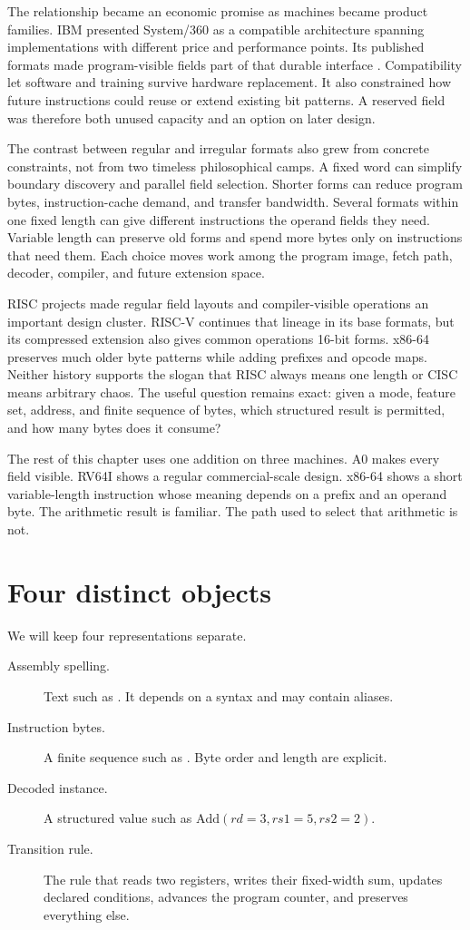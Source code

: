 The relationship became an economic promise as machines became product
families. IBM presented System/360 as a compatible architecture spanning
implementations with different price and performance points. Its published
formats made program-visible fields part of that durable interface
\autocite{amdahl1964system360,ibm1964system360principles}. Compatibility let
software and training survive hardware replacement. It also constrained how
future instructions could reuse or extend existing bit patterns. A reserved
field was therefore both unused capacity and an option on later design.

The contrast between regular and irregular formats also grew from concrete
constraints, not from two timeless philosophical camps. A fixed word can
simplify boundary discovery and parallel field selection. Shorter forms can
reduce program bytes, instruction-cache demand, and transfer bandwidth.
Several formats within one fixed length can give different instructions the
operand fields they need. Variable length can preserve old forms and spend
more bytes only on instructions that need them. Each choice moves work among
the program image, fetch path, decoder, compiler, and future extension space.

RISC projects made regular field layouts and compiler-visible operations an
important design cluster. RISC-V continues that lineage in its base formats,
but its compressed extension also gives common operations 16-bit forms.
x86-64 preserves much older byte patterns while adding prefixes and opcode
maps. Neither history supports the slogan that RISC always means one length
or CISC means arbitrary chaos. The useful question remains exact: given a
mode, feature set, address, and finite sequence of bytes, which structured
result is permitted, and how many bytes does it consume?

The rest of this chapter uses one addition on three machines. A0 makes every
field visible. RV64I shows a regular commercial-scale design. x86-64 shows a
short variable-length instruction whose meaning depends on a prefix and an
operand byte. The arithmetic result is familiar. The path used to select that
arithmetic is not.

\section{Four distinct objects}

We will keep four representations separate.

\begin{description}
\item[Assembly spelling.] Text such as . It depends on a
syntax and may contain aliases.
\item[Instruction bytes.] A finite sequence such as . Byte
order and length are explicit.
\item[Decoded instance.] A structured value such as
\(
  \mathrm{Add}(rd=3,rs1=5,rs2=2).
\)
\item[Transition rule.] The rule that reads two registers, writes their
fixed-width sum, updates declared conditions, advances the program counter,
and preserves everything else.
\end{description}

